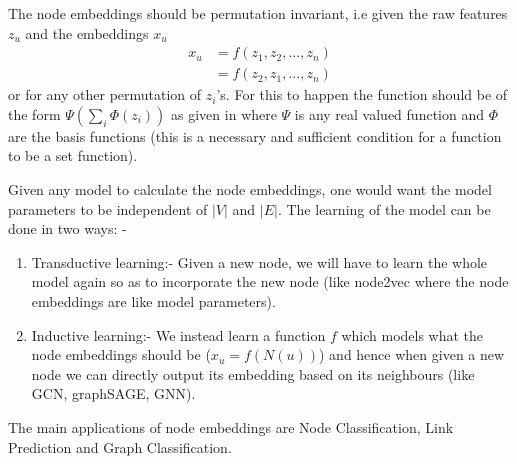 \documentclass{article}
\begin{document}
The node embeddings should be permutation invariant, i.e given the raw features $z_u$ and the embeddings $x_u$
\begin{align*}
    x_u & = f(z_1, z_2, ..., z_n) \\
    & = f(z_2, z_1, ..., z_n)
\end{align*}
or for any other permutation of $z_i$'s. For this to happen the function should be of the form $\Psi(\sum_i\Phi(z_i))$ as given in \cite{zaheer2018deep} where $\Psi$ is any real valued function and $\Phi$ are the basis functions (this is a necessary and sufficient condition for a function to be a set function).


Given any model to calculate the node embeddings, one would want the model parameters to be independent of $|V|$ and $|E|$.  The learning of the model can be done in two ways: -
\begin{enumerate}
    \item Transductive learning:- Given a new node, we will have to learn the whole model again so as to incorporate the new node (like node2vec where the node embeddings are like model parameters).
    \item Inductive learning:- We instead learn a function $f$ which models what the node embeddings should be ($x_u = f(N(u))$) and hence when given a new node we can directly output its embedding based on its neighbours (like GCN, graphSAGE, GNN).
\end{enumerate}
The main applications of node embeddings are Node Classification, Link Prediction and Graph Classification.


\end{document}
